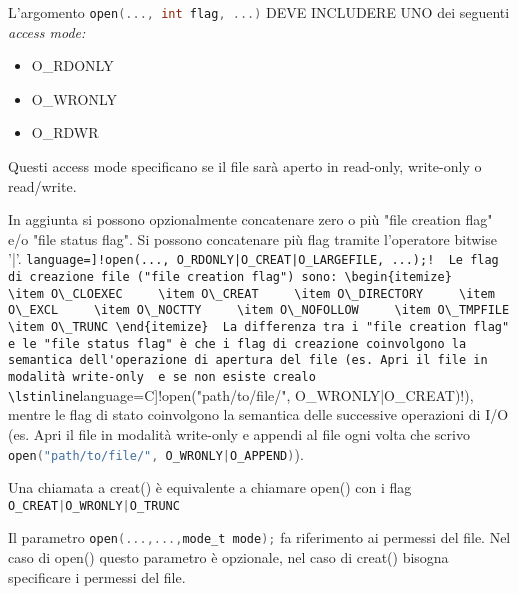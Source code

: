 \documentclass
[10pt,        %
 a4paper,     %
 onecolumn,   %
 fleqn,       %
 oneside,     %
 notitlepage, %
]{article}    %
\begin{document}


L'argomento \lstinline[language=C]!open(..., int flag, ...)! DEVE INCLUDERE UNO dei seguenti \textit{access mode:} 
\begin{itemize}
    \item O\_RDONLY
    \item O\_WRONLY
    \item O\_RDWR
\end{itemize}
Questi access mode specificano se il file sarà aperto in read-only, write-only o read/write.

In aggiunta si possono opzionalmente concatenare zero o più "file creation flag" e/o "file status flag". Si possono concatenare più flag tramite l'operatore bitwise '|'.
\lstinline[language=]!open(..., O_RDONLY|O_CREAT|O_LARGEFILE, ...);!

Le flag di creazione file ("file creation flag") sono:
\begin{itemize}
    \item O\_CLOEXEC
    \item O\_CREAT
    \item O\_DIRECTORY
    \item O\_EXCL
    \item O\_NOCTTY
    \item O\_NOFOLLOW
    \item O\_TMPFILE
    \item O\_TRUNC
\end{itemize}

La differenza tra i "file creation flag" e le "file status flag" è che i flag di creazione coinvolgono la semantica dell'operazione di apertura del file (es. Apri il file in modalità write-only  e se non esiste crealo \lstinline[language=C]!open("path/to/file/", O_WRONLY|O_CREAT)!), mentre le flag di stato coinvolgono la semantica delle successive operazioni di I/O (es. Apri il file in modalità write-only e appendi al file ogni volta che scrivo \lstinline[language=C]!open("path/to/file/", O_WRONLY|O_APPEND)!).

Una chiamata a creat() è equivalente a chiamare open() con i flag \lstinline[language=C]!O_CREAT|O_WRONLY|O_TRUNC!

Il parametro \lstinline[language=C]!open(...,...,mode_t mode);! fa riferimento ai permessi del file. Nel caso di open() questo parametro è opzionale, nel caso di creat() bisogna specificare i permessi del file.
\end{document}
